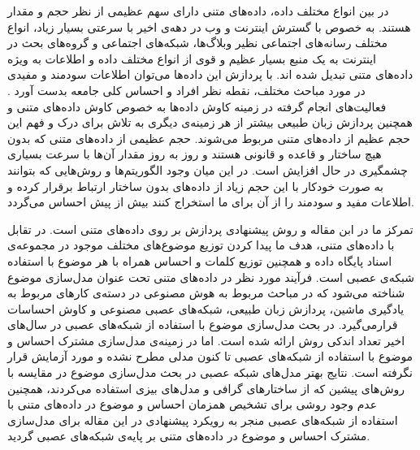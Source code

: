 \documentclass[12pt,a4paper]{article}
\begin{document}
در بین انواع مختلف داده، داده‌های متنی دارای سهم عظیمی‌ از نظر حجم و مقدار هستند. به خصوص با گسترش اینترنت  و وب در دهه‌ی اخیر با سرعتی‌ بسیار زیاد، انواع مختلف رسانه‌های اجتماعی نظیر وبلاگ‌ها، شبکه‌های اجتماعی و گروه‌های بحث در اینترنت به یک منبع بسیار عظیم و قوی از انواع مختلف داده و اطلاعات به  ویژه داده‌‌های  متنی تبدیل شده اند. با پردازش این داده‌ها می‌‌توان اطلاعات سودمند و مفیدی در مورد مباحث مختلف، نقطه نظر افراد و احساس کلی‌ جامعه بدست آورد 
\cite{lin2012weakly}.
 فعالیت‌های انجام گرفته در زمینه کاوش داده‌ها به خصوص کاوش داده‌های متنی و همچنین پردازش زبان طبیعی بیشتر از هر زمینه‌ی دیگری به تلاش برای درک و فهم این حجم عظیم از داده‌های متنی مربوط می‌‌شوند. حجم عظیمی از داده‌های متنی که بدون هیچ ساختار و قاعده و قانونی‌ هستند و روز به روز مقدار آن‌ها با سرعت بسیاری چشمگیری در حال افزایش است. در این میان وجود الگوریتم‌ها و روش‌هایی که بتوانند به صورت خودکار با این حجم زیاد از داده‌های بدون ساختار ارتباط برقرار کرده و اطلاعات مفید و سودمند را از آن برای ما استخراج کنند بیش از پیش احساس می‌‌گردد.

تمرکز ما در ابن مقاله و روش پیشنهادی پردازش بر روی داده‌های متنی است. در تقابل با داده‌های متنی، هدف ما پیدا کردن توزیع موضوع‌های مختلف موجود در مجموعه‌ی اسناد پایگاه داده و همچنین توزیع کلمات و احساس همراه با هر موضوع با استفاده شبکه‌ی عصبی است. فرآیند مورد نظر در داده‌های متنی تحت عنوان مدل‌سازی موضوع شناخته می‌‌شود که در مباحث مربوط به هوش مصنوعی در دسته‌ی کارهای مربوط به یادگیری ماشین، پردازش زبان طبیعی، شبکه‌های عصبی مصنوعی و کاوش احساسات قرارمی‌‌گیرد. در بحث مدل‌سازی موضوع با استفاده از شبکه‌های عصبی در سال‌های اخیر تعداد اندکی‌ روش ارائه شده است. اما در زمینه‌‌ی مدل‌سازی مشترک احساس و موضوع با استفاده از شبکه‌های عصبی تا کنون مدلی‌ مطرح نشده و مورد آزمایش قرار نگرفته است. نتایج بهتر مدل‌های شبکه عصبی در بحث مدل‌سازی موضوع در مقایسه با روش‌های پیشین که از ساختارهای گرافی‌ و مدل‌های بیزی استفاده می‌‌کردند، همچنین عدم وجود روشی‌ برای تشخیص همزمان احساس و موضوع در داده‌های متنی با استفاده از شبکه‌های عصبی منجر به رویکرد پیشنهادی در این مقاله برای مدل‌سازی مشترک احساس و موضوع در داده‌های متنی بر پایه‌ی شبکه‌های عصبی گردید.
\end{document}
